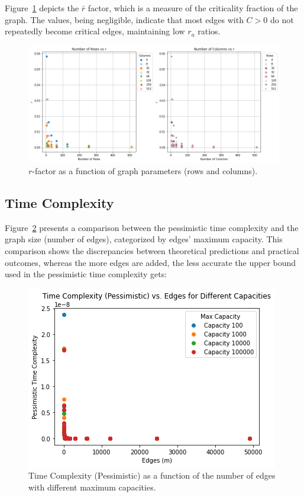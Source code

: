\documentclass{article}
\begin{document}
Figure~\ref{fig:r_factor} depicts the \( \bar{r} \) factor, which is a measure of the criticality fraction of the graph. The values, being negligible, indicate that most edges with \( C > 0 \) do not repeatedly become critical edges, maintaining low $r_a$ ratios.

\begin{figure}[H]
\centering
  \centering
  \includegraphics[width=1.0\linewidth]{rfactor.png}
  \caption{$r$-factor as a function of graph parameters (rows and columns).}
  \label{fig:r_factor}
\end{figure}

\subsection{Time Complexity}

Figure~\ref{fig:pessimistic} presents a comparison between the pessimistic time complexity and the graph size (number of edges), categorized by edges' maximum capacity. This comparison shows the discrepancies between theoretical predictions and practical outcomes, whereas the more edges are added, the less accurate the upper bound used in the pessimistic time complexity gets:

\begin{figure}[H]
\centering
\includegraphics[width=0.6\linewidth]{pessimistic_time.png}
\caption{Time Complexity (Pessimistic) as a function of the number of edges with different maximum capacities.}
\label{fig:pessimistic}
\end{figure}
\end{document}

